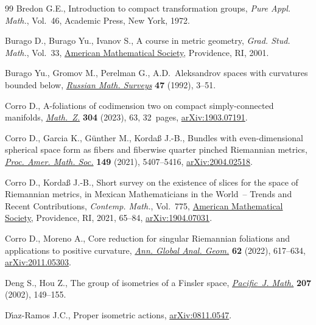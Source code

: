 \begin{thebibliography}{99}
Bredon G.E., Introduction to compact transformation groups, \textit{Pure Appl.
 Math.}, Vol.~46, Academic Press, New York, 1972.

Burago D., Burago Yu., Ivanov S., A course in metric geometry, \textit{Grad.
 Stud. Math.}, Vol.~33, \href{https://doi.org/10.1090/gsm/033}{American
 Mathematical Society}, Providence, RI, 2001.

Burago Yu., Gromov M., Perelman G., A.{D}.~{A}leksandrov spaces with curvatures
 bounded below,
 \href{https://doi.org/10.1070/RM1992v047n02ABEH000877}{\textit{Russian Math.
 Surveys}} \textbf{47} (1992), 3--51.

Corro D., A-foliations of codimension two on compact simply-connected
 manifolds,
 \href{https://doi.org/10.1007/s00209-023-03317-3}{\textit{Math.~Z.}}
 \textbf{304} (2023), 63, 32~pages,
 \href{http://arxiv.org/abs/1903.07191}{arXiv:1903.07191}.

Corro D., Garcia K., G\"unther M., Korda{\ss} J.-B., Bundles with even-dimensional
 spherical space form as fibers and fiberwise quarter pinched {R}iemannian
 metrics, \href{https://doi.org/10.1090/proc/15649}{\textit{Proc. Amer. Math.
 Soc.}} \textbf{149} (2021), 5407--5416,
 \href{http://arxiv.org/abs/2004.02518}{arXiv:2004.02518}.

Corro D., Korda{\ss} J.-B., Short survey on the existence of slices for the
 space of {R}iemannian metrics, in Mexican {M}athematicians in the {W}orld~--
 {T}rends and {R}ecent {C}ontributions, \textit{Contemp. Math.}, Vol.~775,
 \href{https://doi.org/10.1090/conm/775/15589}{American Mathematical Society}, Providence, RI, 2021, 65--84, \href{http://arxiv.org/abs/1904.07031}{arXiv:1904.07031}.

Corro D., Moreno A., Core reduction for singular {R}iemannian foliations and
 applications to positive curvature,
 \href{https://doi.org/10.1007/s10455-022-09856-y}{\textit{Ann. Global Anal.
 Geom.}} \textbf{62} (2022), 617--634,
 \href{http://arxiv.org/abs/2011.05303}{arXiv:2011.05303}.

Deng S., Hou Z., The group of isometries of a {F}insler space,
 \href{https://doi.org/10.2140/pjm.2002.207.149}{\textit{Pacific~J. Math.}}
 \textbf{207} (2002), 149--155.

D\'{\i}az-Ramos J.C., Proper isometric actions,
 \href{http://arxiv.org/abs/0811.0547}{arXiv:0811.0547}.


\end{thebibliography}
